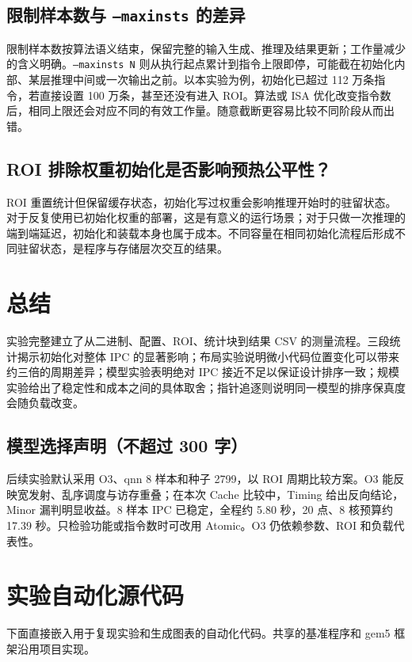 \documentclass[12pt,a4paper,fontset=mac]{ctexart}
\begin{document}
\subsection{限制样本数与 \texttt{--maxinsts} 的差异}
限制样本数按算法语义结束，保留完整的输入生成、推理及结果更新；工作量减少的含义明确。\texttt{--maxinsts N} 则从执行起点累计到指令上限即停，可能截在初始化内部、某层推理中间或一次输出之前。以本实验为例，初始化已超过 112 万条指令，若直接设置 100 万条，甚至还没有进入 ROI。算法或 ISA 优化改变指令数后，相同上限还会对应不同的有效工作量。随意截断更容易比较不同阶段从而出错。

\subsection{ROI 排除权重初始化是否影响预热公平性？}
ROI 重置统计但保留缓存状态，初始化写过权重会影响推理开始时的驻留状态。对于反复使用已初始化权重的部署，这是有意义的运行场景；对于只做一次推理的端到端延迟，初始化和装载本身也属于成本。不同容量在相同初始化流程后形成不同驻留状态，是程序与存储层次交互的结果。

\section{总结}
实验完整建立了从二进制、配置、ROI、统计块到结果 CSV 的测量流程。三段统计揭示初始化对整体 IPC 的显著影响；布局实验说明微小代码位置变化可以带来约三倍的周期差异；模型实验表明绝对 IPC 接近不足以保证设计排序一致；规模实验给出了稳定性和成本之间的具体取舍；指针追逐则说明同一模型的排序保真度会随负载改变。

\subsection*{模型选择声明（不超过 300 字）}
后续实验默认采用 O3、qnn 8 样本和种子 2799，以 ROI 周期比较方案。O3 能反映宽发射、乱序调度与访存重叠；在本次 Cache 比较中，Timing 给出反向结论，Minor 漏判明显收益。8 样本 IPC 已稳定，全程约 5.80 秒，20 点、8 核预算约 17.39 秒。只检验功能或指令数时可改用 Atomic。O3 仍依赖参数、ROI 和负载代表性。

\appendix
\clearpage
\section{实验自动化源代码}
下面直接嵌入用于复现实验和生成图表的自动化代码。共享的基准程序和 gem5 框架沿用项目实现。
\end{document}
